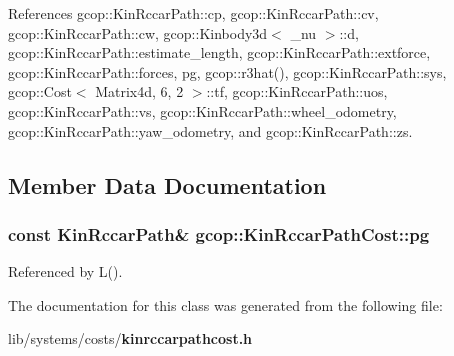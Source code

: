 \-References gcop\-::\-Kin\-Rccar\-Path\-::cp, gcop\-::\-Kin\-Rccar\-Path\-::cv, gcop\-::\-Kin\-Rccar\-Path\-::cw, gcop\-::\-Kinbody3d$<$ \-\_\-nu $>$\-::d, gcop\-::\-Kin\-Rccar\-Path\-::estimate\-\_\-length, gcop\-::\-Kin\-Rccar\-Path\-::extforce, gcop\-::\-Kin\-Rccar\-Path\-::forces, pg, gcop\-::r3hat(), gcop\-::\-Kin\-Rccar\-Path\-::sys, gcop\-::\-Cost$<$ Matrix4d, 6, 2 $>$\-::tf, gcop\-::\-Kin\-Rccar\-Path\-::uos, gcop\-::\-Kin\-Rccar\-Path\-::vs, gcop\-::\-Kin\-Rccar\-Path\-::wheel\-\_\-odometry, gcop\-::\-Kin\-Rccar\-Path\-::yaw\-\_\-odometry, and gcop\-::\-Kin\-Rccar\-Path\-::zs.



\subsection{\-Member \-Data \-Documentation}
\subsubsection[{pg}]{\setlength{\rightskip}{0pt plus 5cm}const {\bf \-Kin\-Rccar\-Path}\& {\bf gcop\-::\-Kin\-Rccar\-Path\-Cost\-::pg}}\label{classgcop_1_1KinRccarPathCost_a766fcba27bf4e7295b6f40ec621a2333}


\-Referenced by \-L().



\-The documentation for this class was generated from the following file\-:\begin{DoxyCompactItemize}
\item 
lib/systems/costs/{\bf kinrccarpathcost.\-h}\end{DoxyCompactItemize}
